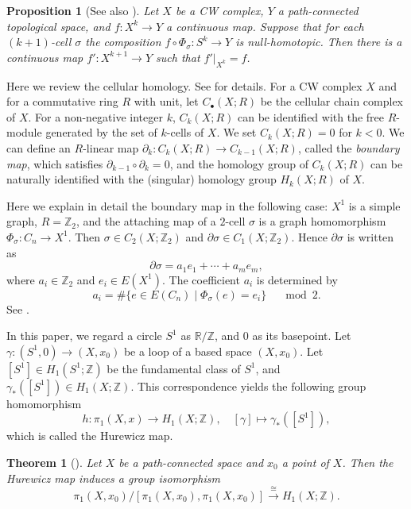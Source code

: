 \documentclass[11pt, amsfonts]{amsart}
\numberwithin{equation}{section}
\newtheorem{theorem}[thm]{Theorem}
\newtheorem{proposition}[thm]{Proposition}
\theoremstyle{definition}
\theoremstyle{remark}
\newcommand{\ZZ}{\mathbb{Z}}
\newcommand{\RR}{\mathbb{R}}
\begin{document}
\begin{proposition}[{See also \cite[Lemma~4.7 and its proof]{Hatcher}}] \label{proposition extension}
Let $X$ be a CW complex, $Y$ a path-connected topological space, and $f \colon X^k \to Y$ a continuous map. Suppose that for each $(k+1)$-cell $\sigma$ the composition $f \circ \Phi_\sigma \colon S^k \to Y$ is null-homotopic. Then there is a continuous map $f' \colon X^{k+1} \to Y$ such that $f' |_{X^k} = f$.
\end{proposition}

Here we review the cellular homology. See \cite[Section~2.2, Section~3.A]{Hatcher} for details. For a CW complex $X$ and for a commutative ring $R$ with unit, let $C_\bullet(X ; R)$ be the cellular chain complex of $X$. For a non-negative integer $k$, $C_k(X; R)$ can be identified with the free $R$-module generated by the set of $k$-cells of $X$. We set $C_k(X; R) = 0$ for $k < 0$. We can define an $R$-linear map $\partial_k \colon C_k(X; R) \to C_{k-1}(X ; R)$, called the \emph{boundary map}, which satisfies $\partial_{k-1} \circ \partial_k = 0$, and the homology group of $C_k(X; R)$ can be naturally identified with the (singular) homology group $H_k(X; R)$ of $X$.

Here we explain in detail the boundary map in the following case: $X^1$ is a simple graph, $R = \ZZ_2$, and the attaching map of a $2$-cell $\sigma$ is a graph homomorphism $\Phi_\sigma \colon C_n \to X^1$. Then $\sigma \in C_2(X; \ZZ_2)$ and $\partial \sigma \in C_1(X; \ZZ_2)$. Hence $\partial \sigma$ is written as
\[ \partial \sigma = a_1 e_1 + \cdots + a_m e_m,\]
where $a_i \in \ZZ_2$ and $e_i \in E(X^1)$. The coefficient $a_i$ is determined by
\[ a_i = \# \{ e \in E(C_{n}) \mid \Phi_\sigma(e) = e_i \} \quad \mod 2.\]
See \cite[Proposition~2.3, Cellular boundary formula in Section~2.2]{Hatcher}.

In this paper, we regard a circle $S^1$ as $\RR / \ZZ$, and $0$ as its basepoint. Let $\gamma \colon (S^1, 0) \to (X,x_0)$ be a loop of a based space $(X,x_0)$. Let $[S^1] \in H_1(S^1; \ZZ)$ be the fundamental class of $S^1$, and $\gamma_*([S^1]) \in H_1(X; \ZZ)$. This correspondence yields the following group homomorphism
\[ h \colon \pi_1(X, x) \to H_1(X; \ZZ), \quad [\gamma] \mapsto \gamma_*([S^1]),\]
which is called the Hurewicz map.

\begin{theorem}[{\cite[Theorem~2A.1]{Hatcher}}] \label{theorem abelianization}
Let $X$ be a path-connected space and $x_0$ a point of $X$. Then the Hurewicz map induces a group isomorphism
\[ \pi_1(X, x_0) / [\pi_1(X, x_0), \pi_1(X, x_0)] \xrightarrow{\cong} H_1(X; \ZZ).\]
\end{theorem}
\end{document}
